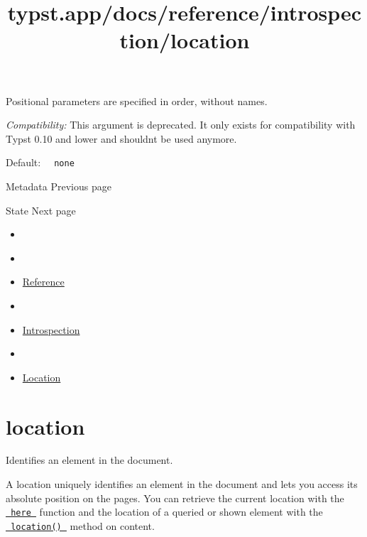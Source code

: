 \label{parameters-location-positional-tooltip}
Positional parameters are specified in order, without names.

\emph{Compatibility:} This argument is deprecated. It only exists for
compatibility with Typst 0.10 and lower and shouldn\textquotesingle t be
used anymore.

Default: \texttt{\ }{\texttt{\ none\ }}\texttt{\ }

\href{/docs/reference/introspection/metadata/}{\pandocbounded{}}

{ Metadata } { Previous page }

\href{/docs/reference/introspection/state/}{\pandocbounded{}}

{ State } { Next page }


\title{typst.app/docs/reference/introspection/location}

\begin{itemize}
\tightlist
\item
  \href{/docs}{}
\item
  
\item
  \href{/docs/reference/}{Reference}
\item
  
\item
  \href{/docs/reference/introspection/}{Introspection}
\item
  
\item
  \href{/docs/reference/introspection/location/}{Location}
\end{itemize}

\section{\texorpdfstring{{ location }}{ location }}\label{summary}

Identifies an element in the document.

A location uniquely identifies an element in the document and lets you
access its absolute position on the pages. You can retrieve the current
location with the
\href{/docs/reference/introspection/here/}{\texttt{\ here\ }} function
and the location of a queried or shown element with the
\href{/docs/reference/foundations/content/\#definitions-location}{\texttt{\ location()\ }}
method on content.

